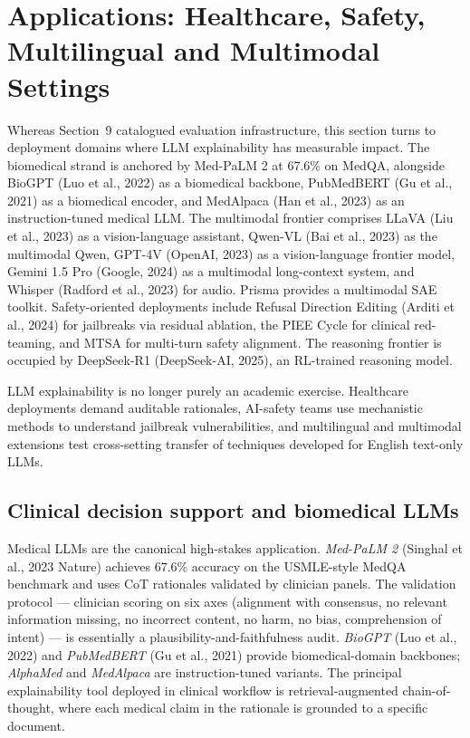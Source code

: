 \documentclass{article}
\begin{document}
\section{Applications: Healthcare, Safety, Multilingual and Multimodal Settings}\label{applications-healthcare-safety-multilingual-and-multimodal-settings}

Whereas Section~9 catalogued evaluation infrastructure, this section turns to deployment domains where LLM explainability has measurable impact. The biomedical strand is anchored by Med-PaLM 2 \citep{singhal2023largelanguagemodel} at 67.6\% on MedQA, alongside BioGPT (Luo et al., 2022) as a biomedical backbone, PubMedBERT (Gu et al., 2021) as a biomedical encoder, and MedAlpaca (Han et al., 2023) as an instruction-tuned medical LLM. The multimodal frontier comprises LLaVA (Liu et al., 2023) as a vision-language assistant, Qwen-VL (Bai et al., 2023) as the multimodal Qwen, GPT-4V (OpenAI, 2023) as a vision-language frontier model, Gemini 1.5 Pro (Google, 2024) as a multimodal long-context system, and Whisper (Radford et al., 2023) for audio. Prisma \citep{joseph2025prismaanopensource} provides a multimodal SAE toolkit. Safety-oriented deployments include Refusal Direction Editing (Arditi et al., 2024) for jailbreaks via residual ablation, the PIEE Cycle \citep{trabilsy2025thepieecycleastruc} for clinical red-teaming, and MTSA \citep{guo2025mtsamultiturnsafet} for multi-turn safety alignment. The reasoning frontier is occupied by DeepSeek-R1 (DeepSeek-AI, 2025), an RL-trained reasoning model.

LLM explainability is no longer purely an academic exercise. Healthcare deployments demand auditable rationales, AI-safety teams use mechanistic methods to understand jailbreak vulnerabilities, and multilingual and multimodal extensions test cross-setting transfer of techniques developed for English text-only LLMs.

\subsection{Clinical decision support and biomedical LLMs}\label{clinical-decision-support-and-biomedical-llms}

Medical LLMs are the canonical high-stakes application. \emph{Med-PaLM 2} (Singhal et al., 2023 Nature) achieves 67.6\% accuracy on the USMLE-style MedQA benchmark and uses CoT rationales validated by clinician panels. The validation protocol --- clinician scoring on six axes (alignment with consensus, no relevant information missing, no incorrect content, no harm, no bias, comprehension of intent) --- is essentially a plausibility-and-faithfulness audit. \emph{BioGPT} (Luo et al., 2022) and \emph{PubMedBERT} (Gu et al., 2021) provide biomedical-domain backbones; \emph{AlphaMed} and \emph{MedAlpaca} are instruction-tuned variants. The principal explainability tool deployed in clinical workflow is retrieval-augmented chain-of-thought, where each medical claim in the rationale is grounded to a specific document.
\end{document}
